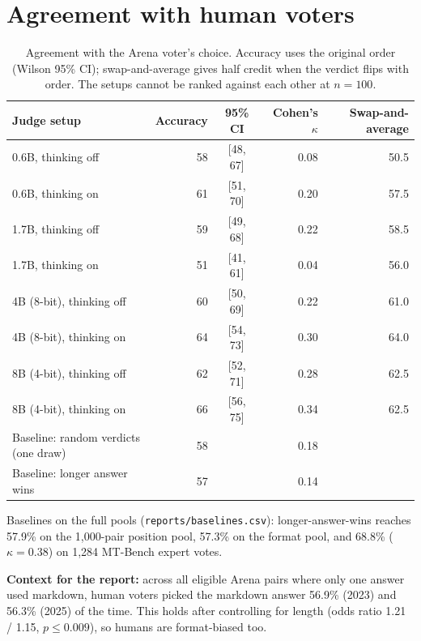 \documentclass[10.5pt]{article}
\begin{document}
\section{Agreement with human voters}
\begin{table}[H]
\centering\small
\caption{Agreement with the Arena voter's choice. Accuracy uses the original order (Wilson 95\% CI);
swap-and-average gives half credit when the verdict flips with order. The setups cannot be ranked against each
other at $n=100$.}
\begin{tabular}{lrcrr}
\toprule
Judge setup & Accuracy & 95\% CI & Cohen's $\kappa$ & Swap-and-average \\
\midrule
0.6B, thinking off & 58 & [48, 67] & 0.08 & 50.5 \\
0.6B, thinking on & 61 & [51, 70] & 0.20 & 57.5 \\
1.7B, thinking off & 59 & [49, 68] & 0.22 & 58.5 \\
1.7B, thinking on & 51 & [41, 61] & 0.04 & 56.0 \\
4B (8-bit), thinking off & 60 & [50, 69] & 0.22 & 61.0 \\
4B (8-bit), thinking on & 64 & [54, 73] & 0.30 & 64.0 \\
8B (4-bit), thinking off & 62 & [52, 71] & 0.28 & 62.5 \\
8B (4-bit), thinking on & 66 & [56, 75] & 0.34 & 62.5 \\
\midrule
Baseline: random verdicts (one draw) & 58 & & 0.18 & \\
Baseline: longer answer wins & 57 & & 0.14 & \\
\bottomrule
\end{tabular}
\end{table}
Baselines on the full pools (\texttt{reports/baselines.csv}): longer-answer-wins reaches 57.9\% on the
1{,}000-pair position pool, 57.3\% on the format pool, and 68.8\% ($\kappa=0.38$) on 1{,}284 MT-Bench expert votes.

\textbf{Context for the report:} across all eligible Arena pairs where only one answer used markdown, human
voters picked the markdown answer 56.9\% (2023) and 56.3\% (2025) of the time. This holds after controlling for
length (odds ratio 1.21 / 1.15, $p\le0.009$), so humans are format-biased too.
\end{document}

